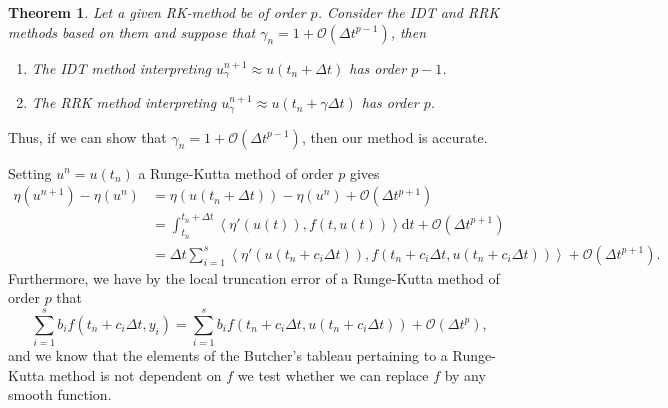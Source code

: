 \documentclass{article}
\newtheorem{theorem}{Theorem}[section]
\newcommand{\inner}[2]{\left< #1 , #2 \right>}
\begin{document}
    \begin{theorem}\label{Th_Ketcheson}
        Let a given RK-method be of order \(p\). Consider the IDT and RRK methods based on them and suppose that \(\gamma_n = 1 + \mathcal{O}(\Delta t^{p-1})\), then
        \begin{enumerate}
            \item The IDT method interpreting \(u_{\gamma}^{n+1} \approx u(t_n + \Delta t)\) has order \(p-1\).
            \item The RRK method interpreting \(u_{\gamma}^{n+1} \approx u(t_n + \gamma \Delta t)\) has order \(p\).
        \end{enumerate}
    \end{theorem}

    \vspace*{3mm}
    \noindent
    Thus, if we can show that \(\gamma_n = 1 + \mathcal{O}(\Delta t^{p-1})\), then our method is accurate.

    \vspace*{5mm}
    Setting \(u^n = u(t_n)\) a Runge-Kutta method of order \(p\) gives
    \begin{align}
        \eta(u^{n+1})-\eta(u^n) &= \eta(u(t_n + \Delta t)) - \eta(u^n) + \mathcal{O}(\Delta t^{p+1}) \nonumber \\
        &= \int_{t_n}^{t_n + \Delta t} \inner{\eta'(u(t))}{f(t, u(t))}\text{d}t + \mathcal{O}(\Delta t^{p+1}) \nonumber \\
        &= \Delta t \sum_{i=1}^{s} \inner{\eta'(u(t_n + c_i\Delta t))}{f(t_n+c_i\Delta t,u(t_n+c_i\Delta t))} + \mathcal{O}(\Delta t^{p+1}). \label{Eq_for_Corr}
    \end{align}
    Furthermore, we have by the local truncation error of a Runge-Kutta method of order \(p\) that
    \[ \sum_{i=1}^{s}b_if(t_n+c_i\Delta t, y_i) = \sum_{i=1}^{s}b_if(t_n + c_i\Delta t, u(t_n + c_i \Delta t)) + \mathcal{O}(\Delta t^p),\] and we know that the elements of the Butcher's tableau pertaining to a Runge-Kutta method is not dependent on \(f\) we test whether we can replace \(f\) by any smooth function.
\end{document}
